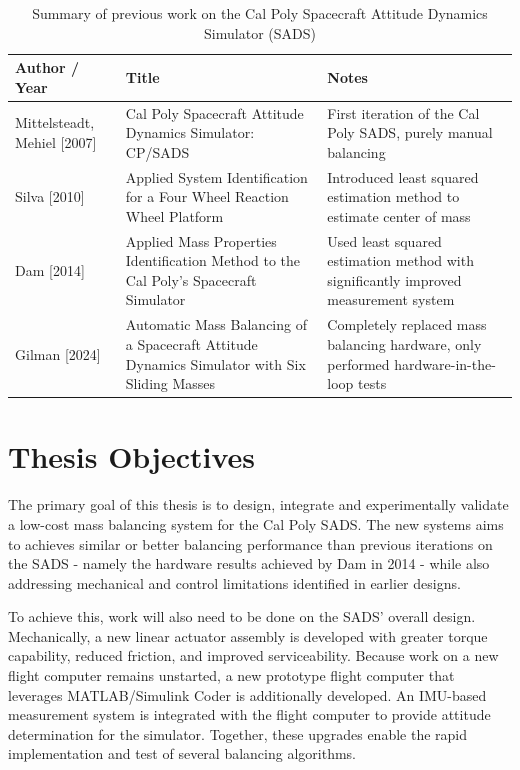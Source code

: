 \begin{table}[h!]
\caption{Summary of previous work on the Cal Poly Spacecraft Attitude Dynamics Simulator (SADS)}
\label{table:sads_history}
\centering
\renewcommand{\arraystretch}{1.4} %

\begin{tabularx}{\textwidth}{
    >{\raggedright\arraybackslash}p{4cm}   %
    >{\raggedright\arraybackslash}p{5cm}   %
    >{\raggedright\arraybackslash}X}       %
\hline
\textbf{Author / Year} & \textbf{Title} & \textbf{Notes} \\
\hline
Mittelsteadt, Mehiel [2007] & 
Cal Poly Spacecraft Attitude Dynamics Simulator: CP/SADS & 
First iteration of the Cal Poly SADS, purely manual balancing \\[2.0em]

Silva [2010] & 
Applied System Identification for a Four Wheel Reaction Wheel Platform & 
Introduced least squared estimation method to estimate center of mass \\[2.0em]

Dam [2014] & 
Applied Mass Properties Identification Method to the Cal Poly's Spacecraft Simulator & 
Used least squared estimation method with significantly improved measurement system \\[2.0em]

Gilman [2024] & 
Automatic Mass Balancing of a Spacecraft Attitude Dynamics Simulator with Six Sliding Masses & 
Completely replaced mass balancing hardware, only performed hardware-in-the-loop tests \\
\hline
\end{tabularx}
\end{table}

\section{Thesis Objectives} 

The primary goal of this thesis is to design, integrate and experimentally validate a low-cost mass balancing system for the Cal Poly SADS. The new systems aims to achieves similar or better balancing performance than previous iterations on the SADS - namely the hardware results achieved by Dam in 2014 - while also addressing mechanical and control limitations identified in earlier designs. 

To achieve this, work will also need to be done on the SADS' overall design. Mechanically, a new linear actuator assembly is developed with greater torque capability, reduced friction, and improved serviceability. Because work on a new flight computer remains unstarted, a new prototype flight computer that leverages MATLAB/Simulink Coder is additionally developed. An IMU-based measurement system is integrated with the flight computer to provide attitude determination for the simulator. Together, these upgrades enable the rapid implementation and test of several balancing algorithms.

